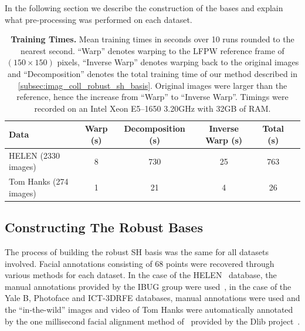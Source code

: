In the following section we describe the construction of the bases and explain
what pre-processing was performed on each dataset.
\begin{table}
    \centering
    \begin{tabular}{lccccc}
        \toprule
        \textbf{Data}          & \textbf{Warp (s)} & \textbf{Decomposition (s)} & \textbf{Inverse Warp (s)} & \textbf{Total (s)} \\ \midrule
        HELEN (2330 images)    & 8                 & 730                        & 25                        & 763                \\
        Tom Hanks (274 images) & 1                 & 21                         & 4                         & 26                 \\  \bottomrule
    \end{tabular}
    \caption{\textbf{Training Times.} Mean training times in seconds over 10
             runs rounded to the nearest second. ``Warp'' denotes warping to the
             LFPW reference frame of $(150 \times 150)$ pixels, ``Inverse Warp''
             denotes warping back to the original images and ``Decomposition''
             denotes the total training time of our method described in
             \cref{subsec:imag_coll_robust_sh_basis}. Original images were larger than 
             the reference, hence the increase from ``Warp'' to ``Inverse Warp''.
             Timings were recorded on an Intel Xeon E5--1650 3.20GHz with
             32GB of RAM.}
\label{tbl:imag_coll_timings}
\end{table}
\subsection{Constructing The Robust Bases}\label{subsec:imag_coll_construction}
The process of building the robust SH basis was the same for all datasets
involved. Facial annotations consisting of 68 points were recovered through
various methods for each dataset. In the case of the 
HELEN~\cite{le2012interactive} database, the manual
annotations provided by the IBUG group were used~\cite{sagonas2013300,sagonas2013semi},
in the case of the Yale B, Photoface and ICT-3DRFE databases, manual annotations
were used and the ``in-the-wild'' images and video of Tom Hanks were automatically
annotated by the one millisecond facial alignment method of~\cite{kazemi2014one}
provided by the Dlib project~\cite{king2009dlib}.

